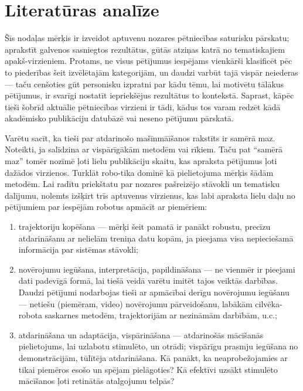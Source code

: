 \documentclass[12pt, a4paper]{article}
\numberwithin{equation}{section} %
\begin{document}
\newpage
\section{Literatūras analīze}

Šīs nodaļas mērķis ir izveidot aptuvenu nozares pētniecības saturisku pārskatu; aprakstīt galvenos sasniegtos rezultātus, gūtās atziņas katrā no tematiskajiem apakš-virzieniem. Protams, ne visus pētījumus iespējams vienkārši klasificēt pēc to piederības šeit izvēlētajām kategorijām, un daudzi varbūt tajā vispār neiederas --- taču cenšoties gūt personisku izpratni par kādu tēmu, lai motivētu tālākus pētījumus, ir svarīgi nostatīt iepriekšējus rezultātus to kontekstā. Saprast, kāpēc tieši šobrīd aktuālie pētniecības virzieni ir tādi, kādus tos varam redzēt kādā akadēmisko publikāciju datubāzē vai neseno pētījumu pārskatā.

Varētu sacīt, ka tieši par atdarinošo mašīnmāīšanos rakstīts ir samērā maz. Noteikti, ja salīdzina ar vispārīgākām metodēm vai rīkiem. Taču pat ``samērā maz'' tomēr nozīmē ļoti lielu publikāciju skaitu, kas apraksta pētījumus ļoti dažādos virzienos. Turklāt robo-tika dominē kā pielietojuma mērķis šādām metodēm. Lai radītu priekštatu par nozares pašreizējo stāvokli un tematisku dalījumu, nolemts izšķirt trīs aptuvenus virzienus, kas labi apraksta lielu daļu no pētījumiem par iespējām robotus apmācīt ar piemēriem:

\begin{enumerate}
    \item trajektoriju kopēšana --- mērķi šeit pamatā ir panākt robustu, precīzu atdarināšanu ar nelielām treniņa datu kopām, ja pieejama visa nepieciešamā informācija par sistēmas stāvokli;
    \item novērojumu iegūšana, interpretācija, papildināšana --- ne vienmēr ir pieejami dati padevīgā formā, lai tiešā veidā varētu imitēt tajos veiktās darbības. Daudzi pētījumi nodarbojas tieši ar apmācībai derīgu novērojumu iegūšanu --- netiešu (piemēram, video) novērojumu pārveidošanu, labākām cilvēka-robota saskarnes metodēm, trajektorijām ar nezināmām darbībām, u.c.;
    \item atdarināšana un adaptācija, vispārināšana --- atdarinošās mācīšanās pielietojums, lai uzlabotu stimulēto, un otrādi; vispārīgu prasmju iegūšana no demonstrācijām, tūlītēja atdarināšana. Kā panākt, ka neaprobežojamies ar tikai piemēros esošo un spējam pielāgoties? Kā efektīvi uzsākt stimulēto mācīšanos ļoti retinātās atalgojumu telpās?
\end{enumerate}
\end{document}
